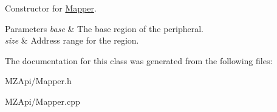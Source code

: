 Constructor for \mbox{\hyperlink{classMapper}{Mapper}}. 
\begin{DoxyParams}{Parameters}
{\em base} & The base region of the peripheral. \\
\hline
{\em size} & Address range for the region. \\
\hline
\end{DoxyParams}


The documentation for this class was generated from the following files\+:\begin{DoxyCompactItemize}
\item 
M\+Z\+Api/Mapper.\+h\item 
M\+Z\+Api/Mapper.\+cpp\end{DoxyCompactItemize}
